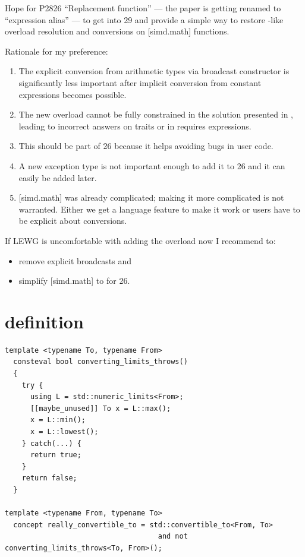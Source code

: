 Hope for P2826 “Replacement function” --- the paper is getting renamed to “expression alias” --- to
get into \CC{}29 and provide a simple way to restore -like overload resolution and
conversions on [simd.math] functions.

Rationale for my preference:
\begin{enumerate}
  \item The explicit conversion from arithmetic types via broadcast constructor is significantly
    less important after implicit conversion from constant expressions becomes possible.
  \item The new  overload cannot be fully constrained in the solution presented in
    , leading to incorrect answers on traits or in requires expressions.
  \item This should be part of \CC{}26 because it helps avoiding bugs in user code.
  \item A new exception type is not important enough to add it to \CC{}26 and it can easily be added
    later.
  \item{} [simd.math] was already complicated; making it more complicated is not warranted.
    Either we get a language feature to make it work or users have to be explicit about conversions.
\end{enumerate}

If LEWG is uncomfortable with adding the  overload now I recommend to:
\begin{itemize}
  \item remove explicit broadcasts and
  \item simplify [simd.math] to  for \CC{}26.
\end{itemize}



\appendix
\let\appendix=\relax
\section{ definition}\label{sec:really-convertible}
\medskip\begin{lstlisting}[style=Vc]
template <typename To, typename From>
  consteval bool converting_limits_throws()
  {
    try {
      using L = std::numeric_limits<From>;
      [[maybe_unused]] To x = L::max();
      x = L::min();
      x = L::lowest();
    } catch(...) {
      return true;
    }
    return false;
  }

template <typename From, typename To>
  concept really_convertible_to = std::convertible_to<From, To>
                                    and not converting_limits_throws<To, From>();
\end{lstlisting}



